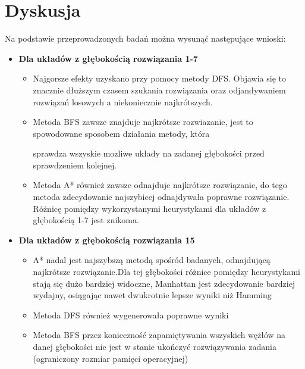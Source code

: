 \documentclass{classrep}
\begin{document}
    \section{Dyskusja}
    {

        Na podstawie przeprowadzonych badań można wysunąć następujące wnioski:
         \begin{itemize}
         \setlength\itemsep{1em}
            \item {\textbf{Dla układów z głębokością rozwiązania 1-7}}
                \begin{itemize}

                    \item{Najgorsze efekty uzyskano przy pomocy metody DFS.
            Objawia się to znacznie dłuższym czasem szukania rozwiązania oraz odjandywaniem rozwiązań losowych a niekoniecznie najkrótszych.}

                    \item{ Metoda BFS zawsze znajduje najkrótsze rozwiazanie, jest to spowodowane sposobem działania metody, która

            sprawdza wszyskie mozliwe układy na zadanej głębokości przed sprawdzeniem kolejnej.}

                    \item{Metoda A* również zawsze odnajduje najkrótsze rozwiązanie, do tego metoda zdecydowanie najszybicej odnajdywała poprawne rozwiązanie.
            Różnicę pomiędzy wykorzystanymi heurystykami dla układów z głębokością 1-7 jest znikoma.}
                \end{itemize}
            \item {\textbf{Dla układów z głębokością rozwiązania 15}}
                 \begin{itemize}

                    \item { A* nadal jest najszybszą metodą spośród badanych, odnajdującą najkrótsze rozwiązanie.Dla tej głębokości różnice pomiędzy heurystykami stają się dużo bardziej widoczne, Manhattan jest zdecydowanie bardziej wydajny, osiągając nawet dwukrotnie lepsze wyniki niż Hamming}

                    \item{Metoda DFS również wygenerowała poprawne wyniki}

                    \item{Metoda BFS przez konieczność zapamiętywania wszyskich wężłów na danej głębokości
            nie jest w stanie ukończyć rozwiązywania zadania (ograniczony rozmiar pamięci operacyjnej)}
                \end{itemize}
            \end{itemize}

      }\label{sec:dyskusja}
\end{document}
